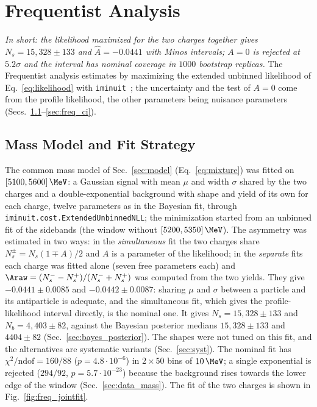 \section{Frequentist Analysis}
\label{sec:frequentist}
\label{app:freq}
\emph{In short: the likelihood maximized for the two charges together gives $N_s=15{,}328\pm133$ and $\hat A=-0.0441$ with Minos intervals; $A=0$ is rejected at $5.2\sigma$ and the interval has nominal coverage in $1000$ bootstrap replicas.}
The Frequentist analysis estimates \Araw by maximizing the extended unbinned likelihood of Eq.~\eqref{eq:likelihood} with \texttt{iminuit}~\cite{iminuit}; the uncertainty and the test of $A=0$ come from the profile likelihood, the other parameters being nuisance parameters (Secs.~\ref{sec:freq_model}--\ref{sec:freq_ci}).
\subsection{Mass Model and Fit Strategy}
\label{sec:freq_model}
\label{sec:freq_simfit}
The common mass model of Sec.~\ref{sec:model} (Eq.~\eqref{eq:mixture}) was fitted on $[5100,5600]\,\MeV$: a Gaussian signal with mean $\mu$ and width $\sigma$ shared by the two charges and a double-exponential background with shape and yield of its own for each charge, twelve parameters as in the Bayesian fit, through \texttt{iminuit.cost.ExtendedUnbinnedNLL}; the minimization started from an unbinned fit of the sidebands (the window without $[5200,5350]\,\MeV$). The asymmetry was estimated in two ways: in the \emph{simultaneous} fit the two charges share $N_s^\pm=N_s(1\mp A)/2$ and $A$ is a parameter of the likelihood; in the \emph{separate} fits each charge was fitted alone (seven free parameters each) and $\Araw=(N_s^--N_s^+)/(N_s^-+N_s^+)$ was computed from the two yields. They give $-0.0441\pm0.0085$ and $-0.0442\pm0.0087$: sharing $\mu$ and $\sigma$ between a particle and its antiparticle is adequate, and the simultaneous fit, which gives the profile-likelihood interval directly, is the nominal one. It gives $N_s=15{,}328\pm133$ and $N_b=4{,}403\pm82$, against the Bayesian posterior medians $15{,}328\pm133$ and $4404\pm82$ (Sec.~\ref{sec:bayes_posterior}). The shapes were not tuned on this fit, and the alternatives are systematic variants (Sec.~\ref{sec:syst}). The nominal fit has $\chi^2/\mathrm{ndof}=160/88$ ($p=4.8\cdot 10^{-6}$) in $2\times50$ bins of $10\,\MeV$; a single exponential is rejected ($294/92$, $p=5.7\cdot 10^{-23}$) because the background rises towards the lower edge of the window (Sec.~\ref{sec:data_mass}). The fit of the two charges is shown in Fig.~\ref{fig:freq_jointfit}.

